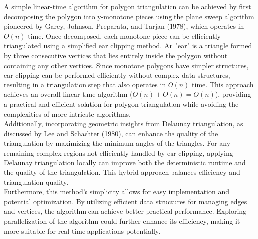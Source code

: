 \documentclass{article}
\begin{document}
A simple linear-time algorithm for polygon triangulation can be achieved by first decomposing the polygon into y-monotone pieces using the plane sweep algorithm pioneered by Garey, Johnson, Preparata, and Tarjan (1978), which operates in \( O(n) \) time. Once decomposed, each monotone piece can be efficiently triangulated using a simplified ear clipping method. An "ear" is a triangle formed by three consecutive vertices that lies entirely inside the polygon without containing any other vertices. 
Since monotone polygons have simpler structures, ear clipping can be performed efficiently without complex data structures, resulting in a triangulation step that also operates in \( O(n) \) time. This approach achieves an overall linear-time algorithm (\( O(n) + O(n) = O(n) \)), providing a practical and efficient solution for polygon triangulation while avoiding the complexities of more intricate algorithms.
\\
Additionally, incorporating geometric insights from Delaunay triangulation, as discussed by Lee and Schachter (1980), can enhance the quality of the triangulation by maximizing the minimum angles of the triangles. For any remaining complex regions not efficiently handled by ear clipping, applying Delaunay triangulation locally can improve both the deterministic runtime and the quality of the triangulation. This hybrid approach balances efficiency and triangulation quality.
\\
Furthermore, this method's simplicity allows for easy implementation and potential optimization. By utilizing efficient data structures for managing edges and vertices, the algorithm can achieve better practical performance. Exploring parallelization of the algorithm could further enhance its efficiency, making it more suitable for real-time applications potentially.

\newpage
\end{document}
